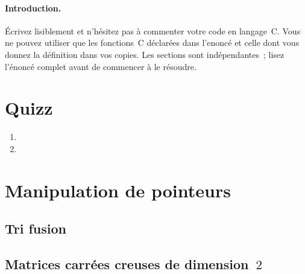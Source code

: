 \documentclass[ds]{sujet}
\begin{document}
\formation{} 
\matiere{}  
\auteur{} 
\def\SujetClsNumero{}
\paragraph{Introduction.}
\'Ecrivez lisiblement et n'h\'esitez pas \`a commenter votre code en
langage~C. 
Vous ne pouvez utiliser que les fonctions~C  d\'eclar\'ees
dans l'enonc\'e et celle dont vous donnez la d\'efinition dans vos copies.
Les sections sont ind\'ependantes~; lisez l'\'enonc\'e
complet avant de commencer \`a le r\'esoudre.
\section{Quizz}
\begin{enumerate}
\item
\item
\end{enumerate}

\section{Manipulation de pointeurs}
\subsection{Tri fusion}

\subsection{Matrices carr\'ees creuses de dimension~$2$} 


\end{document}
